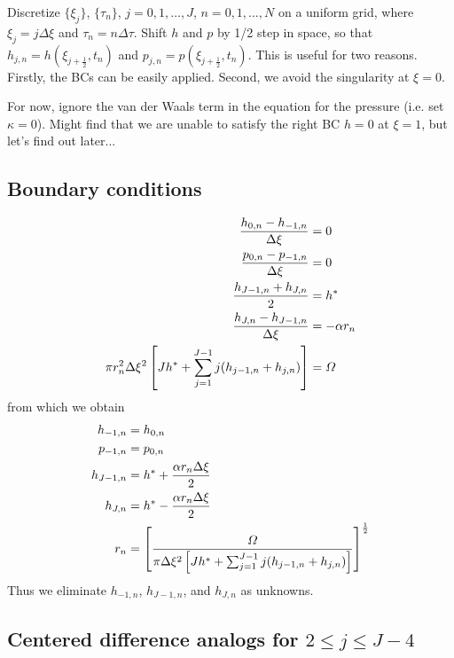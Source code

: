 \documentclass[12pt]{article}
\numberwithin{equation}{section}
\begin{document}
Discretize $\{ \xi_j\}$, $\{ \tau_n\}$, $j = 0, 1, \dots, J$, $n = 0, 1, \dots, N$ on a uniform grid, where $\xi_j = j \Delta \xi$ and $\tau_n = n \Delta \tau$. Shift $h$ and $p$ by 1/2 step in space, so that $h_{j,n} = h(\xi_{j+\frac{1}{2}},t_n)$ and $p_{j,n} = p(\xi_{j+\frac{1}{2}},t_n)$. This is useful for two reasons. Firstly, the BCs can be easily applied. Second, we avoid the singularity at $\xi = 0$.


For now, ignore the van der Waals term in the equation for the pressure (i.e. set $\kappa = 0$). Might find that we are unable to satisfy the right BC $h = 0$ at $\xi = 1$, but let's find out later...


\subsection{Boundary conditions}

\begin{align}
	\frac{h_{0,n} - h_{-1,n}}{\Delta \xi} &= 0
	\\
	\frac{p_{0,n} - p_{-1,n}}{\Delta \xi} &= 0
	\\
	\frac{h_{J-1,n} + h_{J,n}}{2} &= h^*
	\\
	\frac{h_{J,n} - h_{J-1,n}}{\Delta \xi} &= - \alpha r_n
	\\
	\pi r_n^2 \Delta \xi^2 \left[ Jh^* +   \sum_{j=1}^{J-1} j (h_{j-1,n} + h_{j,n}) \right]& = \mit{\Omega}
\end{align}
from which we obtain
\begin{align}
	 h_{-1,n} &=  h_{0,n}
	\\
	 p_{-1,n}&=  p_{0,n}
	\\
	 h_{J-1,n}&= h^* + \frac{\alpha r_{n} \Delta \xi}{2}
	\\
	h_{J,n}&=  h^*- \frac{\alpha r_{n} \Delta \xi}{2}
	\\
	 r_n &= \left[
	 	\frac{\mit{\Omega}}{\pi  \Delta \xi^2 \left[ Jh^* +   \sum_{j=1}^{J-1} j (h_{j-1,n} + h_{j,n}) \right]}
	 \right]^{\frac{1}{2}}
\end{align}
Thus we eliminate $h_{-1,n}$, $h_{J-1,n}$, and $h_{J,n}$ as unknowns.  




\subsection{Centered difference analogs for $2 \le j \le J-4$}
\end{document}
